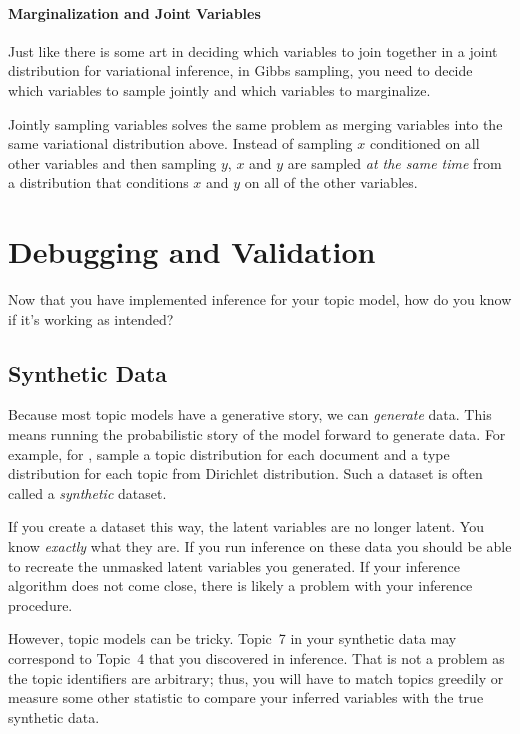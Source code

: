 \paragraph{Marginalization and Joint Variables}

Just like there is some art in deciding which variables to join
together in a joint distribution for variational inference, in Gibbs
sampling, you need to decide which variables to sample jointly and
which variables to marginalize.

Jointly sampling variables solves the same problem as merging
variables into the same variational distribution above.  Instead of
sampling $x$ conditioned on all other variables and then sampling $y$,
$x$ and $y$ are sampled \emph{at the same time} from a distribution
that conditions $x$ and $y$ on all of the other variables.

\section{Debugging and Validation}

Now that you have implemented inference for your topic model, how do
you know if it's working as intended?

\subsection{Synthetic Data}

Because most topic models have a generative story, we can
\emph{generate} data.  This means running the probabilistic story of
the model forward to generate data.  For example, for ,
sample a topic distribution for each document and a type distribution
for each topic from Dirichlet distribution.  Such a dataset is often
called a \emph{synthetic} dataset.

If you create a dataset this way, the latent variables are no longer
latent.  You know \emph{exactly} what they are.  If you run inference
on these data you should be able to recreate the unmasked latent
variables you generated.  If your inference algorithm does not come
close, there is likely a problem with your inference procedure.

However, topic models can be tricky.  Topic~7 in your synthetic data
may correspond to Topic~4 that you discovered in inference.  That is
not a problem as the topic identifiers are arbitrary; thus, you will
have to match topics greedily or measure some other statistic to
compare your inferred variables with the true synthetic data.

